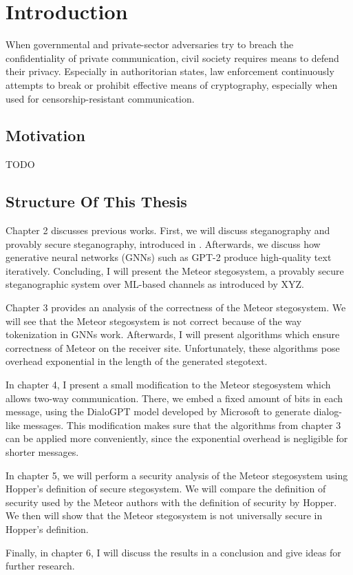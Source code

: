 \chapter{Introduction}

When governmental and private-sector adversaries try to breach the confidentiality of private communication, civil society requires means to defend their privacy.
Especially in authoritorian states, law enforcement continuously attempts to break or prohibit effective means of cryptography, especially when used for censorship-resistant communication.

\section{Motivation}

TODO

\section{Structure Of This Thesis}

Chapter 2 discusses previous works.
First, we will discuss steganography and provably secure steganography, introduced in \cite{Hopper04}.
Afterwards, we discuss how generative neural networks (GNNs) such as GPT-2 produce high-quality text iteratively.
Concluding, I will present the Meteor stegosystem, a provably secure steganographic system over ML-based channels as introduced by XYZ.

Chapter 3 provides an analysis of the correctness of the Meteor stegosystem. 
We will see that the Meteor stegosystem is not correct because of the way tokenization in GNNs work.
Afterwards, I will present algorithms which ensure correctness of Meteor on the receiver site.
Unfortunately, these algorithms pose overhead exponential in the length of the generated stegotext.


In chapter 4, I present a small modification to the Meteor stegosystem which allows two-way communication.
There, we embed a fixed amount of bits in each message, using the DialoGPT model developed by Microsoft \cite{Zhang2020} to generate dialog-like messages.
This modification makes sure that the algorithms from chapter 3 can be applied more conveniently, since the exponential overhead is negligible for shorter messages.

In chapter 5, we will perform a security analysis of the Meteor stegosystem using Hopper's definition of secure stegosystem.
We will compare the definition of security used by the Meteor authors with the definition of security by Hopper.
We then will show that the Meteor stegosystem is not universally secure in Hopper's definition.

Finally, in chapter 6, I will discuss the results in a conclusion and give ideas for further research.